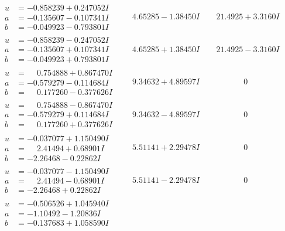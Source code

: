 \documentclass[1p]{elsarticle_modified}
\theoremstyle{definition}
\begin{document}
$$\begin{array}{c|c|c}
\begin{aligned}
u &= -0.858239 + 0.247052 I \\
a &= -0.135607 - 0.107341 I \\
b &= -0.049923 - 0.793801 I\end{aligned}
 & \phantom{-}4.65285 - 1.38450 I & \phantom{-}21.4925 + 3.3160 I \\ \hline\begin{aligned}
u &= -0.858239 - 0.247052 I \\
a &= -0.135607 + 0.107341 I \\
b &= -0.049923 + 0.793801 I\end{aligned}
 & \phantom{-}4.65285 + 1.38450 I & \phantom{-}21.4925 - 3.3160 I \\ \hline\begin{aligned}
u &= \phantom{-}0.754888 + 0.867470 I \\
a &= -0.579279 - 0.114684 I \\
b &= \phantom{-}0.177260 - 0.377626 I\end{aligned}
 & \phantom{-}9.34632 + 4.89597 I & \phantom{-0.000000 } 0 \\ \hline\begin{aligned}
u &= \phantom{-}0.754888 - 0.867470 I \\
a &= -0.579279 + 0.114684 I \\
b &= \phantom{-}0.177260 + 0.377626 I\end{aligned}
 & \phantom{-}9.34632 - 4.89597 I & \phantom{-0.000000 } 0 \\ \hline\begin{aligned}
u &= -0.037077 + 1.150490 I \\
a &= \phantom{-}2.41494 + 0.68901 I \\
b &= -2.26468 - 0.22862 I\end{aligned}
 & \phantom{-}5.51141 + 2.29478 I & \phantom{-0.000000 } 0 \\ \hline\begin{aligned}
u &= -0.037077 - 1.150490 I \\
a &= \phantom{-}2.41494 - 0.68901 I \\
b &= -2.26468 + 0.22862 I\end{aligned}
 & \phantom{-}5.51141 - 2.29478 I & \phantom{-0.000000 } 0 \\ \hline\begin{aligned}
u &= -0.506526 + 1.045940 I \\
a &= -1.10492 - 1.20836 I \\
b &= -0.137683 + 1.058590 I\end{aligned}

\end{array}$$
\end{document}
